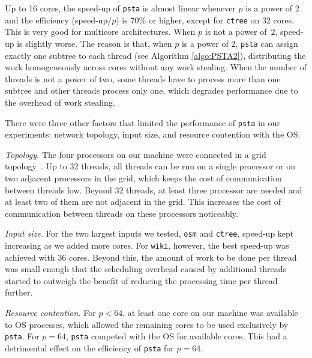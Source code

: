 Up to 16 cores, the speed-up of {\tt psta} is almost linear whenever $p$ is a
power of $2$ and the efficiency (speed-up/$p$) is 70\% or higher, except for
{\tt ctree} on 32 cores.
This is very good for multicore architectures.
When $p$ is not a power of~$2$, speed-up is slightly worse.
The reason is that, when $p$ is a power of $2$, {\tt psta} can assign exactly
one subtree to each thread (see Algorithm \ref{algo:PSTA2}), distributing the
work homogeneously across cores without any work stealing.
When the number of threads is not a power of two, some threads have to process
more than one subtree and other threads process only one, which degrades
performance due to the overhead of work stealing.

There were three other factors that limited the performance of {\tt psta} in
our experiments: network topology, input size, and resource contention with
the OS.

\textit{Topology.}
The four processors on our machine were connected in a grid
topology~\cite{Drepper2007}.
Up to 32 threads, all threads can be run on a single processor or on two
adjacent processors in the grid, which keeps the cost of communication between
threads low.
Beyond 32 threads, at least three processor are needed and
at least two of them are not adjacent in the grid.
This increases the cost of communication between threads on these processors
noticeably.

\textit{Input size.}
For the two largest inputs we tested, {\tt osm} and {\tt ctree}, speed-up
kept increasing as we added more cores.
For {\tt wiki}, however, the best speed-up was achieved with 36 cores.
Beyond this, the amount of work to be done per thread was small enough that
the scheduling overhead caused by additional threads started to outweigh the
benefit of reducing the processing time per thread further.

\textit{Resource contention.}
For $p < 64$, at least one core on our machine was available to OS processes,
which allowed the remaining cores to be used exclusively by {\tt psta}.
For $p = 64$, {\tt psta} competed with the OS for available cores.
This had a detrimental effect on the efficiency of {\tt psta} for $p = 64$.

\vspace{-13pt}
